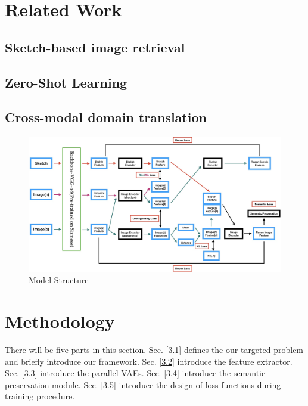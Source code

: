 \documentclass[10pt,twocolumn,letterpaper]{article}
\begin{document}

\section{Related Work}

\subsection{Sketch-based image retrieval}

\subsection{Zero-Shot Learning}

\subsection{Cross-modal domain translation}


\begin{figure}
\begin{center}
\includegraphics[width=0.95\linewidth]{model_structure.jpg}
\end{center}
   \caption{Model Structure}
\label{fig:short}
\end{figure}

\section{Methodology}
There will be five parts in this section. 
Sec. \ref{3.1} defines the our targeted problem and briefly introduce our framework. 
Sec. \ref{3.2} introduce the feature extractor. 
Sec. \ref{3.3} introduce the parallel VAEs. 
Sec. \ref{3.4} introduce the semantic preservation module. 
Sec. \ref{3.5} introduce the design of loss functions during training procedure.
\end{document}
